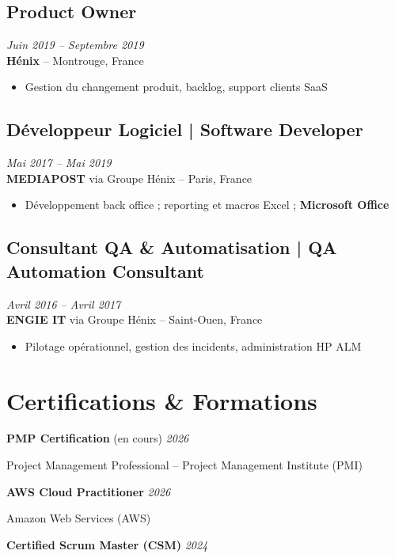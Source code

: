 \documentclass[11pt,a4paper]{article}
\begin{document}
\subsection*{Product Owner} \hfill \textit{Juin 2019 -- Septembre 2019}\\
\textbf{Hénix} -- Montrouge, France\\
\begin{itemize}
    \item Gestion du changement produit, backlog, support clients SaaS
\end{itemize}

\subsection*{Développeur Logiciel | Software Developer} \hfill \textit{Mai 2017 -- Mai 2019}\\
\textbf{MEDIAPOST} via Groupe Hénix -- Paris, France\\
\begin{itemize}
    \item Développement back office ; reporting et macros Excel ; \textbf{Microsoft Office}
\end{itemize}

\subsection*{Consultant QA \& Automatisation | QA Automation Consultant} \hfill \textit{Avril 2016 -- Avril 2017}\\
\textbf{ENGIE IT} via Groupe Hénix -- Saint-Ouen, France\\
\begin{itemize}
    \item Pilotage opérationnel, gestion des incidents, administration HP ALM
\end{itemize}

\section*{Certifications \& Formations}

\textbf{PMP Certification} (en cours) \hfill \textit{2026}

Project Management Professional -- Project Management Institute (PMI)

\textbf{AWS Cloud Practitioner} \hfill \textit{2026}

Amazon Web Services (AWS)

\textbf{Certified Scrum Master (CSM)} \hfill \textit{2024}
\end{document}
